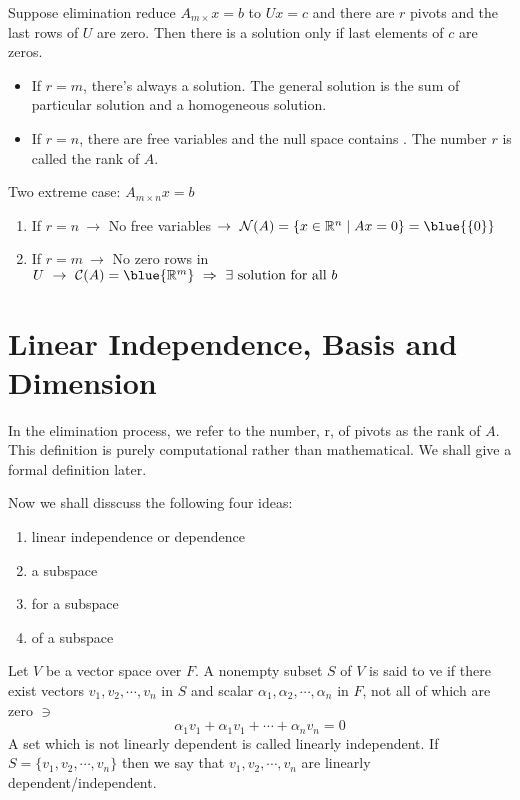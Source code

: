 \begin{theorem}
    Suppose elimination reduce $A_{m \times } x = b$ to $Ux = c$ and there are $r$ pivots and the last  rows of $U$ are zero. Then there is a solution only if last  elements of $c$ are zeros.
    \begin{itemize}
        \item If $r = m$, there's always a solution. The general solution is the sum of particular solution and a homogeneous solution.
        \item If $r = n$, there are  free variables and the null space contains . The number $r$ is called the rank of $A$.
    \end{itemize} 
    Two extreme case: $A_{m\times n}x = b$
    \begin{enumerate}[label=(\arabic*)]
        \item If $r = n \ \rightarrow$ No free variables $\rightarrow \ \mathcal{N}(A) = \{x \in \mathbb{R}^n \;|\; Ax = 0\} = \blue{\{0\}}$ 
        \item If $r = m \ \rightarrow$ No zero rows in $U \ \rightarrow \ \mathcal{C}(A) = \blue{\mathbb{R}^m} \ \Rightarrow \ \exists \ \text{solution for all }b$
    \end{enumerate}
\end{theorem}

\section{Linear Independence, Basis and Dimension}

In the elimination process, we refer to the number, r, of pivots as the rank of $A$. This definition is purely computational rather than mathematical. We shall give a formal definition later.

Now we shall disscuss the following four ideas:
\begin{enumerate}[label=(\roman*)]
    \item linear independence or dependence
    \item \textbf{} a subspace
    \item \textbf{} for a subspace
    \item \textbf{} of a subspace
\end{enumerate}

\newpage

\begin{definition}
    Let $V$ be a vector space over $F$. A nonempty subset $S$ of $V$ is said to ve  if there exist  vectors $v_1, v_2, \cdots, v_n$ in $S$ and scalar $\alpha_1, \alpha_2, \cdots, \alpha_n$ in $F$, not all of which are zero $\ni$
    \[
    \alpha_1 v_1 + \alpha_1 v_1 + \cdots + \alpha_n v_n = 0
    \]
    A set which is not linearly dependent is called linearly independent. If $S = \{v_1, v_2, \cdots, v_n\}$ then we say that $v_1, v_2, \cdots, v_n$ are linearly dependent/independent.
\end{definition}